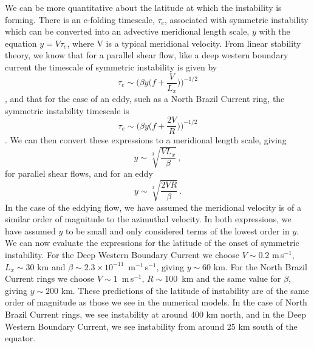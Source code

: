 We can be more quantitative about the latitude at which the instability is forming. There is an e-folding timescale, $\tau_e$, associated with symmetric instability which can be converted into an advective meridional length scale, $y$ with the equation $y = V \tau_e$, where V is a typical meridional velocity. From linear stability theory, we know that for a parallel shear flow, like a deep western boundary current the timescale of symmetric instability is given by
\begin{equation}
    \tau_e \sim \Bigg(\beta y \bigg(f + \frac{V}{L_x}\bigg) \Bigg)^{-1/2}
\end{equation}
\citep{Hoskins1974}, and that for the case of an eddy, such as a North Brazil Current ring, the symmetric instability timescale is
\begin{equation}
    \tau_e \sim \Bigg(\beta y \bigg(f + \frac{2 V}{R}\bigg) \Bigg)^{-1/2}
\end{equation}
\citep{Buckingham2021}. We can then convert these expressions to a meridional length scale, giving
\begin{equation}
    y \sim \sqrt[3]{\frac{V L_x}{\beta}} \, ,
    \label{eq:dwbc_y}
\end{equation}
for parallel shear flows, and for an eddy
\begin{equation}
    y \sim \sqrt[3]{\frac{2 V R}{\beta}} \, .
    \label{eq:nbc_y}
\end{equation}
In the case of the eddying flow, we have assumed the meridional velocity is of a similar order of magnitude to the azimuthal velocity. In both expressions, we have assumed $y$ to be small and only considered terms of the lowest order in $y$. We can now evaluate the expressions for the latitude of the onset of symmetric instability. For the Deep Western Boundary Current we choose $V \sim 0.2$ m\,s$^{-1}$, $L_x \sim 30$ km and $\beta \sim 2.3 \times 10^{-11}$~m$^{-1}$\,s$^{-1}$, giving $y \sim 60$ km. For the North Brazil Current rings we choose $V \sim 1$~m\,s$^{-1}$, $R \sim 100$~km and the same value for $\beta$, giving $y \sim 200$ km. These predictions of the latitude of instability are of the same order of magnitude as those we see in the numerical models. In the case of North Brazil Current rings, we see instability at around 400 km north, and in the Deep Western Boundary Current, we see instability from around 25 km south of the equator.

